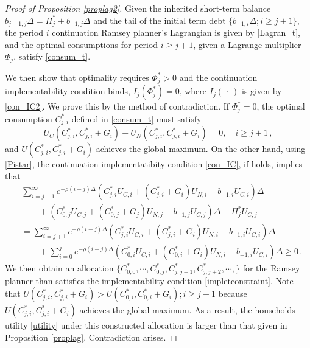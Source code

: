 \documentclass[12pt]{article}
\begin{document}
\begin{proof}[Proof of Proposition \ref{proplag2}]

Given the inherited short-term balance $ b_{j-1, j}\Delta = \Pi_j^* + b_{-1,j} \Delta $ and the tail of the initial term debt $\{b_{-1, i}\Delta; i\geq j+1\}$, the period ${i}$ continuation Ramsey planner's Lagrangian  is given by \eqref{Lagran_t}, and the optimal consumptions for period $i\geq {j+1}$, given a Lagrange multiplier $\Phi_j$, satisfy \eqref{consum_t}. 



We then show that optimality requires $\Phi_j^*>0$ and the continuation implementability condition binds, $I_j(\Phi_j^*)=0$, where $I_j(\, \cdot \,)$ is given by \eqref{con_IC2}. We prove this by the method of contradiction. If $\Phi_j^*=0$, the optimal consumption $C_{j, i}^*$ defined in \eqref{consum_t} must satisfy 
\begin{equation}
U_{C}(C_{j, i}^*, C_{j, i}^*+G_i)+U_N(C_{j, i}^*, C_{j, i}^*+G_i)=0, \quad i\geq j+1\,,
\end{equation} 
and $U(C_{j, i}^*, C_{j, i}^*+G_i)$ achieves the global maximum. On the other hand, using \eqref{Pistar}, the continuation implementatibity condition \eqref{con_IC}, if holds, implies that
\begin{align*}
& \sum_{i=j+1}^{\infty} e^{-\rho(i-j) \Delta} \left(  C_{j, i}^*U_{C, i} + (C_{j, i}^*+G_{i})U_{N, i} -b_{-1, i} U_{C, i} \right) \Delta \nonumber\\
& \quad \quad + \left (C_{0, j}^*U_{C, j} + (C_{0, j}^*+G_{j})U_{N, j} - b_{-1,j} U_{C, j} \right)\Delta - \Pi_{{j}}^*U_{C, j}  \\
& =  \sum_{i=j+1}^{\infty} e^{-\rho(i-j) \Delta} \left(  C_{j, i}^*U_{C, i} + (C_{j, i}^*+G_{i})U_{N, i} -b_{-1, i} U_{C, i} \right) \Delta \nonumber\\
& \quad \quad +	 \sum_{i=0}^{j} e^{-\rho(i-j) \Delta} \left(  C_{0, i}^*U_{C, i} + (C_{0, i}^*+G_{i})U_{N, i} -b_{-1, i} U_{C, i} \right) \Delta \geq 0  \,.
\end{align*}
We then obtain an allocation $\{C_{0, 0}^*, \cdots, C_{0, j}^*, C_{j, j+1}^*, C_{j, j+2}^*, \cdots,\}$ for the Ramsey planner than satisfies the implementability condition \eqref{impletconstraint}. Note that $U(C_{j, i}^*, C_{j, i}^*+G_i)>U(C_{0, i}^*, C_{0, i}^*+G_i); i\geq j+1$ because $U(C_{j, i}^*, C_{j, i}^*+G_i)$ achieves the global maximum. As a result, the households utility \eqref{utility} under this constructed allocation is larger than that given in Proposition \ref{proplag}. Contradiction arises. 

\end{proof}
\end{document}
